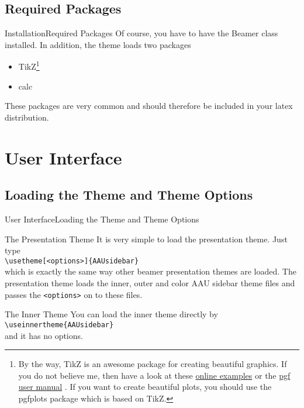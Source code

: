 \documentclass[10pt]{beamer}
\newcommand{\chref}[2]{%
  \href{#1}{{\usebeamercolor[bg]{AAUsidebar}#2}}%
}
\begin{document}
\subsection{Required Packages}
\begin{frame}{Installation}{Required Packages}
  Of course, you have to have the Beamer class installed. In addition, the theme loads two packages
  \begin{itemize}
    \item TikZ\footnote{By the way, TikZ is an awesome package for creating beautiful graphics. If you do not believe me, then have a look at these \chref{http://www.texample.net/tikz/examples/}{online examples} or the \chref{http://tug.ctan.org/tex-archive/graphics/pgf/base/doc/generic/pgf/pgfmanual.pdf}{pgf user manual}. If you want to create beautiful plots, you should use the pgfplots package which is based on TikZ.}
    \item calc
  \end{itemize}
  These packages are very common and should therefore be included in your latex distribution.
\end{frame}

\section{User Interface}
\subsection{Loading the Theme and Theme Options}
\begin{frame}{User Interface}{Loading the Theme and Theme Options}
  \begin{block}{The Presentation Theme}
    It is very simple to load the presentation theme. Just type\\
    {\tt \textbackslash usetheme[<options>]\{AAUsidebar\}}\\
    which is exactly the same way other beamer presentation themes are loaded. The presentation theme loads the inner, outer and color AAU sidebar theme files and passes the {\tt <options>} on to these files.
  \end{block}
  \begin{block}{The Inner Theme}
    You can load the inner theme directly by\\
    {\tt \textbackslash useinnertheme\{AAUsidebar\}}\\
    and it has no options.
  \end{block}
\end{frame}
\end{document}
